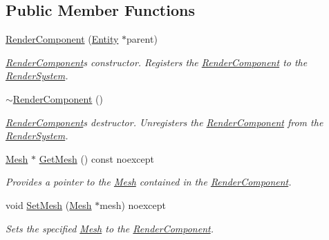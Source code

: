\subsection*{Public Member Functions}
\begin{DoxyCompactItemize}
\item 
\hyperlink{class_blade_1_1_render_component_a7bd09f012ebce3b94c882ed4afd5698f}{Render\+Component} (\hyperlink{class_blade_1_1_entity}{Entity} $\ast$parent)
\begin{DoxyCompactList}\small\item\em \hyperlink{class_blade_1_1_render_component}{Render\+Component}\textquotesingle{}s constructor. Registers the \hyperlink{class_blade_1_1_render_component}{Render\+Component} to the \hyperlink{class_blade_1_1_render_system}{Render\+System}. \end{DoxyCompactList}\item 
\mbox{\label{class_blade_1_1_render_component_ac187f8f4f63a009a15abc6ebfba85b10}} 
\hyperlink{class_blade_1_1_render_component_ac187f8f4f63a009a15abc6ebfba85b10}{$\sim$\+Render\+Component} ()
\begin{DoxyCompactList}\small\item\em \hyperlink{class_blade_1_1_render_component}{Render\+Component}\textquotesingle{}s destructor. Unregisters the \hyperlink{class_blade_1_1_render_component}{Render\+Component} from the \hyperlink{class_blade_1_1_render_system}{Render\+System}. \end{DoxyCompactList}\item 
\hyperlink{class_blade_1_1_mesh}{Mesh} $\ast$ \hyperlink{class_blade_1_1_render_component_acd44eb4419c5c412fbaf080b039b3f44}{Get\+Mesh} () const noexcept
\begin{DoxyCompactList}\small\item\em Provides a pointer to the \hyperlink{class_blade_1_1_mesh}{Mesh} contained in the \hyperlink{class_blade_1_1_render_component}{Render\+Component}. \end{DoxyCompactList}\item 
void \hyperlink{class_blade_1_1_render_component_a23d49cb161e26089cc246c9fb5f739a8}{Set\+Mesh} (\hyperlink{class_blade_1_1_mesh}{Mesh} $\ast$mesh) noexcept
\begin{DoxyCompactList}\small\item\em Sets the specified \hyperlink{class_blade_1_1_mesh}{Mesh} to the \hyperlink{class_blade_1_1_render_component}{Render\+Component}. \end{DoxyCompactList}\item 

\end{DoxyCompactItemize}

